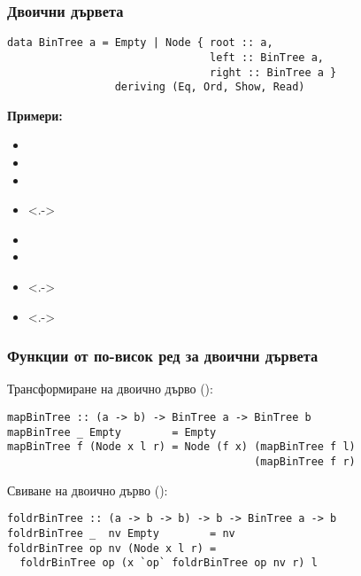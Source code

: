 \documentclass[alsotrans]{beamerswitch}
\begin{document}
\begin{frame}[fragile]
  \frametitle{Двоични дървета}
\begin{lstlisting}
data BinTree a = Empty | Node { root :: a,
                                left :: BinTree a,
                                right :: BinTree a }
                 deriving (Eq, Ord, Show, Read)
\end{lstlisting}
  \textbf{Примери:}
  \begin{itemize}[<+->]
  \item {}
  \item {}
  \item {}
  \item<.-> 
  \item {}
  \item {}
  \item<.-> 
  \item<.-> 
  \end{itemize}
\end{frame}

\begin{frame}[fragile]
  \frametitle{Функции от по-висок ред за двоични дървета}

  Трансформиране на двоично дърво ():
  \pause
\begin{lstlisting}
mapBinTree :: (a -> b) -> BinTree a -> BinTree b
mapBinTree _ Empty        = Empty
mapBinTree f (Node x l r) = Node (f x) (mapBinTree f l)
                                       (mapBinTree f r)
\end{lstlisting}
  \vspace{2em}
  \pause
  Свиване на двоично дърво ():
\begin{lstlisting}
foldrBinTree :: (a -> b -> b) -> b -> BinTree a -> b
foldrBinTree _  nv Empty        = nv
foldrBinTree op nv (Node x l r) =
  foldrBinTree op (x `op` foldrBinTree op nv r) l
\end{lstlisting}
\end{frame}
\end{document}
